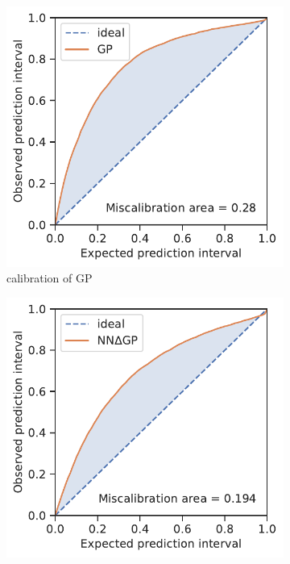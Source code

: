 \documentclass[]{achemso}
\begin{document}
\begin{figure}
\begin{subfigure}[b]{0.32\textwidth}
        \includegraphics[width=\textwidth]{../GP/Matern/calibration.pdf}
        \caption{calibration of \gls{GP}}\label{fig:calibration_example_gp}
    \end{subfigure}
    \begin{subfigure}[b]{0.32\textwidth}
        \includegraphics[width=\textwidth]{../NNdGP/Matern/calibration.pdf}

\end{subfigure}
\end{figure}
\end{document}
